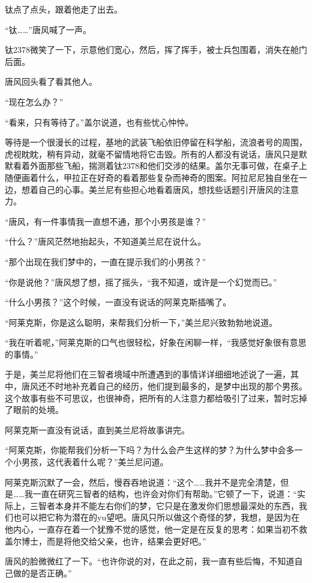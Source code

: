 钛点了点头，跟着他走了出去。 

“钛……”唐风喊了一声。 

钛2378微笑了一下，示意他们宽心，然后，挥了挥手，被士兵包围着，消失在舱门后面。 

唐风回头看了看其他人。 

“现在怎么办？” 

“看来，只有等待了。”盖尔说道，也有些忧心忡忡。 

等待是一个很漫长的过程，基地的武装飞船依旧停留在科学船，流浪者号的周围，虎视眈眈，稍有异动，就毫不留情地将它击毁。所有的人都没有说话，唐风只是默默看着外面那些飞船，揣测着钛2378和他们交涉的结果。盖尔无事可做，在桌子上随便画着什么，甲拉正在好奇的看着那些复杂而神奇的图案。阿拉尼尼独自坐在一边，想着自己的心事。美兰尼有些担心地看着唐风，想找些话题引开唐风的注意力。 

“唐风，有一件事情我一直想不通，那个小男孩是谁？” 

“什么？”唐风茫然地抬起头，不知道美兰尼在说什么。 

“那个出现在我们梦中的，一直在提示我们的小男孩？” 

“你是说他？”唐风想了想，摇了摇头，“我不知道，或许是一个幻觉而已。” 

“什么小男孩？”这个时候，一直没有说话的阿莱克斯插嘴了。 

“阿莱克斯，你是这么聪明，来帮我们分析一下，”美兰尼兴致勃勃地说道。 

“我在听着呢，”阿莱克斯的口气也很轻松，好象在闲聊一样，“我感觉好象很有意思的事情。” 

于是，美兰尼将他们在三智者境域中所遭遇到的事情详详细细地述说了一遍，其中，唐风还不时地补充着自己的经历，他们提到最多的，是梦中出现的那个男孩。这个故事有些不可思议，也很神奇，把所有的人注意力都给吸引了过来，暂时忘掉了眼前的处境。 

阿莱克斯一直没有说话，直到美兰尼将故事讲完。 

“阿莱克斯，你能帮我们分析一下吗？为什么会产生这样的梦？为什么梦中会多一个小男孩，这代表着什么呢？”美兰尼问道。 

阿莱克斯沉默了一会，然后，慢吞吞地说道：“这个……我并不是完全清楚，但是……我一直在研究三智者的结构，也许会对你们有帮助。”它顿了一下，说道：“实际上，三智者本身并不能左右你们的梦，它只是在激发你们思想最深处的东西，我们也可以把它称为潜在的yu望吧。唐风只所以做这个奇怪的梦，我想，是因为在他内心，一直存在着一个犹豫不觉的感觉，他一定是在反复的思考：如果当初不救盖尔博士，而是将他交给父亲，也许，结果会更好吧。” 

唐风的脸微微红了一下。“也许你说的对，在此之前，我一直有些后悔，不知道自己做的是否正确。” 

